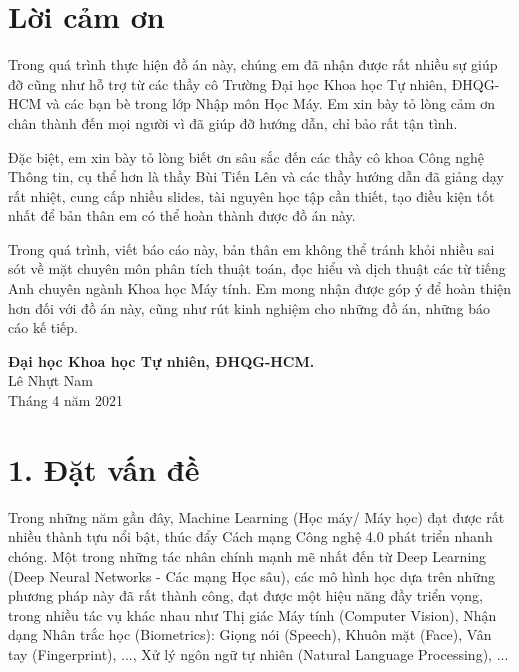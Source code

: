 \documentclass{article}
\begin{document}
	\section*{Lời cảm ơn}
	\vspace{1.0in}
	\begingroup
	\setlength{\parindent}{0pt}
	\qquad Trong quá trình thực hiện đồ án này, chúng em đã nhận được rất nhiều sự giúp đỡ cũng như hỗ trợ từ các thầy cô Trường Đại học Khoa học Tự nhiên, ĐHQG-HCM và các bạn bè trong lớp Nhập môn Học Máy. Em xin bày tỏ lòng cảm ơn chân thành đến mọi người vì đã giúp đỡ hướng dẫn, chỉ bảo rất tận tình.
	
	\qquad Đặc biệt, em xin bày tỏ lòng biết ơn sâu sắc đến các thầy cô khoa Công nghệ Thông tin, cụ thể hơn là thầy Bùi Tiến Lên và các thầy hướng dẫn đã giảng dạy rất nhiệt, cung cấp nhiều slides, tài nguyên học tập cần thiết, tạo điều kiện tốt nhất để bản thân em có thể hoàn thành được đồ án này.
		
	\qquad Trong quá trình, viết báo cáo này, bản thân em không thể tránh khỏi nhiều sai sót về mặt chuyên môn phân tích thuật toán, đọc hiểu và dịch thuật các từ tiếng Anh chuyên ngành Khoa học Máy tính. Em mong nhận được góp ý để hoàn thiện hơn đối với đồ án này, cũng như rút kinh nghiệm cho những đồ án, những báo cáo kế tiếp.
	
	\vspace{1.0in}
	\textbf{Đại học Khoa học Tự nhiên, ĐHQG-HCM.}\\
	Lê Nhựt Nam\\
	Tháng 4 năm 2021\\
	\endgroup
	
	\newpage
	\tableofcontents
	\newpage
	\setcounter{secnumdepth}{0}
	
	\section{1. Đặt vấn đề}
	
	Trong những năm gần đây, Machine Learning (Học máy/ Máy học) đạt được rất nhiều thành tựu nổi bật, thúc đẩy Cách mạng Công nghệ 4.0 phát triển nhanh chóng. Một trong những tác nhân chính mạnh mẽ nhất đến từ Deep Learning (Deep Neural Networks - Các mạng Học sâu), các mô hình học dựa trên những phương pháp này đã rất thành công, đạt được một hiệu năng đầy triển vọng, trong nhiều tác vụ khác nhau như Thị giác Máy tính (Computer Vision), Nhận dạng Nhân trắc học (Biometrics): Giọng nói (Speech), Khuôn mặt (Face), Vân tay (Fingerprint), ..., Xử lý ngôn ngữ tự nhiên (Natural Language Processing), ...
	
\end{document}
